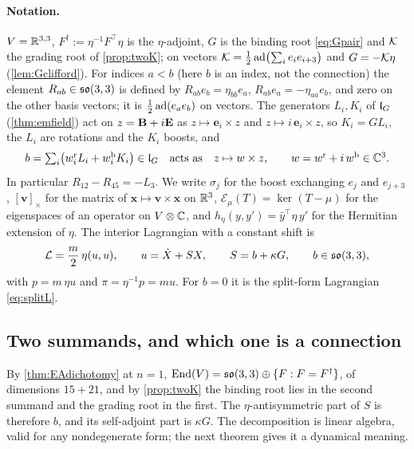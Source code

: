 \paragraph{Notation.} $V=\mathbb{R}^{3,3}$, $F^\dagger:=\eta^{-1}F^{\!\top}\eta$ is the $\eta$-adjoint, $G$ is the binding root \eqref{eq:Gpair} and $\mathcal K$
the grading root of \cref{prop:twoK}; on vectors $\mathcal K=\tfrac12\operatorname{ad}\bigl(\sum_ie_ie_{i+3}\bigr)$ and $G=-\mathcal K\eta$ (\cref{lem:Gclifford}). For indices $a<b$ (here $b$ is an index, not the connection) the
element $R_{ab}\in\mathfrak{so}(3,3)$ is defined by $R_{ab}e_b=\eta_{bb}e_a$, $R_{ab}e_a=-\eta_{aa}e_b$, and zero on the other basis vectors; it is
$\tfrac12\operatorname{ad}(e_ae_b)$ on vectors. The generators $L_i,K_i$ of $\mathfrak l_G$ (\cref{thm:emfield}) act on $z=\mathbf B+i\mathbf E$ as $z\mapsto\mathbf e_i\times z$ and
$z\mapsto i\,\mathbf e_i\times z$, so $K_i=GL_i$, the $L_i$ are rotations and the $K_i$ boosts, and
\begin{equation}
\label{bf:eq:w}
b=\textstyle\sum_i\bigl(w^{\rm r}_iL_i+w^{\rm b}_iK_i\bigr)\in\mathfrak l_G\quad\text{acts as}\quad z\mapsto w\times z,\qquad w=w^{\rm r}+i\,w^{\rm b}\in\mathbb{C}^3 .
\end{equation}
In particular $R_{12}-R_{45}=-L_3$. We write $\sigma_j$ for the boost exchanging $e_j$ and $e_{j+3}$, $[\mathbf v]_\times$ for the matrix of
$\mathbf x\mapsto\mathbf v\times\mathbf x$ on $\mathbb{R}^3$, $\mathcal E_\mu(T)=\ker(T-\mu)$ for the eigenspaces of an operator on $V\otimes\mathbb{C}$, and
$h_\eta(y,y')=\bar y^{\!\top}\eta\,y'$ for the Hermitian extension of $\eta$. The interior Lagrangian with a constant shift is
\begin{equation}
\label{bf:eq:L}
\mathcal L=\frac m2\,\eta(u,u),\qquad u=\dot X+SX,\qquad S=b+\kappa G,\qquad b\in\mathfrak{so}(3,3),
\end{equation}
with $p=m\,\eta u$ and $\pi=\eta^{-1}p=mu$. For $b=0$ it is the split-form Lagrangian \eqref{eq:splitL}.

\subsection{Two summands, and which one is a connection}
\label{sec:bf-split}

By \cref{thm:EAdichotomy} at $n=1$, $\operatorname{End}(V)=\mathfrak{so}(3,3)\oplus\{F:F=F^\dagger\}$, of dimensions $15+21$, and by \cref{prop:twoK} the binding root
lies in the second summand and the grading root in the first. The $\eta$-antisymmetric part of $S$ is therefore $b$, and its self-adjoint part
is $\kappa G$. The decomposition is linear algebra, valid for any nondegenerate form; the next theorem gives it a dynamical meaning.

